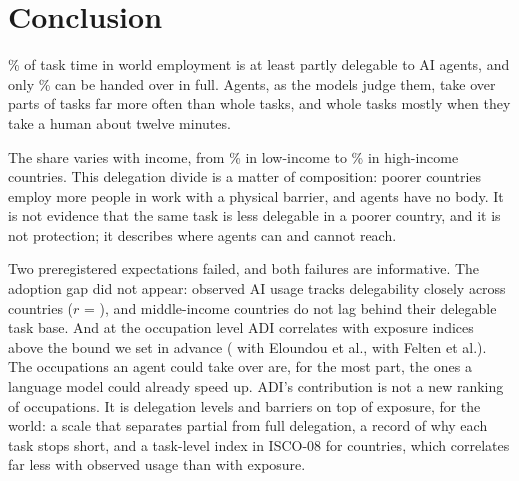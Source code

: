 \section{Conclusion}
\label{sec:conclusion}

\% of task time in world employment is at least partly delegable to AI agents, and only \% can be handed over in full.
Agents, as the models judge them, take over parts of tasks far more often than whole tasks, and whole tasks mostly when they take a human about twelve minutes.

The share varies with income, from \% in low-income to \% in high-income countries.
This delegation divide is a matter of composition: poorer countries employ more people in work with a physical barrier, and agents have no body.
It is not evidence that the same task is less delegable in a poorer country, and it is not protection; it describes where agents can and cannot reach.

Two preregistered expectations failed, and both failures are informative.
The adoption gap did not appear: observed AI usage tracks delegability closely across countries ($r$ = ), and middle-income countries do not lag behind their delegable task base.
And at the occupation level ADI correlates with exposure indices above the bound we set in advance ( with Eloundou et al.,  with Felten et al.).
The occupations an agent could take over are, for the most part, the ones a language model could already speed up.
ADI's contribution is not a new ranking of occupations.
It is delegation levels and barriers on top of exposure, for the world: a scale that separates partial from full delegation, a record of why each task stops short, and a task-level index in ISCO-08 for  countries, which correlates far less with observed usage than with exposure.

